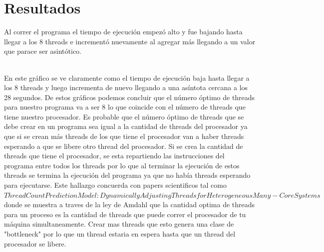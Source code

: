 \documentclass[12pt,a4paper]{article}
\begin{document}
\section{Resultados}
Al correr el programa el tiempo de ejecución empezó alto y fue bajando hasta llegar
a los 8 threads e incrementó nuevamente al agregar más llegando a un valor que parace ser asintótico.
\\

\\
En este gráfico se ve claramente como el tiempo de ejecución baja hasta llegar a
los 8 threads y luego incrementa de nuevo llegando a una asíntota cercana a los 28 segundos.
De estos gráficos podemos concluir que el número óptimo de threads para nuestro programa va a ser
8 lo que coincide con el número de threads que tiene nuestro procesador. Es probable que el número óptimo de
threads que se debe crear en un programa sea igual a la cantidad de threads del procesador ya que si se crean más
threads de los que tiene el procesador van a haber threads esperando a que se libere otro thread del procesador. Si se crea
la cantidad de threads que tiene el procesador, se esta repartiendo las instrucciones del programa entre todos los threads
por lo que al terminar la ejecución de estos threads se termina la ejecución del programa ya que no había threads esperando
para ejecutarse. Este hallazgo concuerda con papers scientificos tal como \href{https://ieeexplore.ieee.org/document/7384327}{$Thread Count Prediction Model: Dynamically Adjusting Threads for Heterogeneous Many-Core Systems$} donde 
se muestra a traves de la ley de Amdahl que la cantidad optima de threads para un proceso es la cantidad de threads que puede correr 
el procesador de tu máquina simultaneamente. Crear mas threads que esto genera una clase de "bottleneck" por lo que un thread estaria 
en espera hasta que un thread del procesador se libere.
\end{document}
